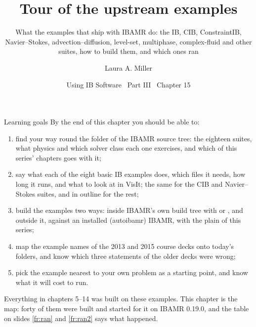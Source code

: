 \documentclass[aspectratio=169,11pt]{beamer}
\title[Tour of the upstream examples]{Tour of the upstream examples}
\subtitle{What the examples that ship with IBAMR do: the IB, CIB, ConstraintIB, Navier--Stokes, advection--diffusion, level-set, multiphase, complex-fluid and other suites, how to build them, and which ones ran}
\author[Miller]{Laura A. Miller}
\institute[UArizona]{Department of Mathematics, University of Arizona}
\date{Using IB Software \textbullet\ Part III \textbullet\ Chapter 15}
\begin{document}
\begin{frame}[plain]
\end{frame}

\begin{frame}{Learning goals}
\label{fr:goals}
\footnotesize By the end of this chapter you should be able to:
\begin{enumerate}
  \item find your way round the  folder of the IBAMR source tree: the eighteen suites, what physics and which solver class each one exercises, and which of this series' chapters goes with it;
  \item say what each of the eight basic IB examples does, which files it needs, how long it runs, and what to look at in VisIt; the same for the CIB and Navier--Stokes suites, and in outline for the rest;
  \item build the examples two ways: inside IBAMR's own build tree with  or , and outside it, against an installed (autoibamr) IBAMR, with the plain  of this series;
  \item map the example names of the 2013 and 2015 course decks onto today's folders, and know which three statements of the older decks were wrong;
  \item pick the example nearest to your own problem as a starting point, and know what it will cost to run.
\end{enumerate}
\begin{punchbox}
\footnotesize Everything in chapters 5--14 was built on these examples. This chapter is the map: forty of them were built and started for it on IBAMR 0.19.0, and the table on slides \ref{fr:ran} and \ref{fr:ran2} says what happened.
\end{punchbox}
\end{frame}
\end{document}
